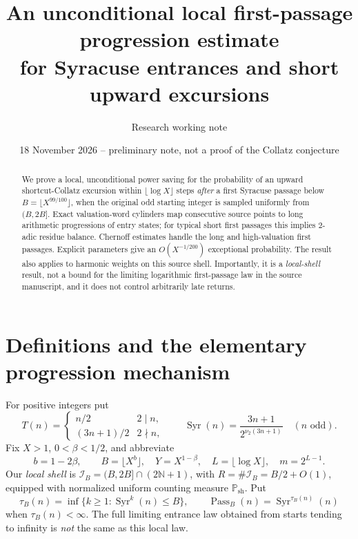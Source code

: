 \documentclass[11pt]{amsart}
\title[Local first-passage progressions]{An unconditional local first-passage progression estimate\\for Syracuse entrances and short upward excursions}
\author{Research working note}
\date{18 November 2026 -- preliminary note, not a proof of the Collatz conjecture}
\theoremstyle{remark}\newtheorem{remark}{Remark}
\newcommand{\N}{\mathbb N}
\newcommand{\Syr}{\operatorname{Syr}}
\newcommand{\Pass}{\operatorname{Pass}}
\newcommand{\Psh}{\mathbb P_{\mathrm{sh}}}
\begin{document}
\begin{abstract}
We prove a local, unconditional power saving for the probability of an upward shortcut-Collatz excursion within $\lfloor\log X\rfloor$ steps \emph{after} a first Syracuse passage below $B=\lfloor X^{99/100}\rfloor$, when the original odd starting integer is sampled uniformly from $(B,2B]$.  Exact valuation-word cylinders map consecutive source points to long arithmetic progressions of entry states; for typical short first passages this implies $2$-adic residue balance.  Chernoff estimates handle the long and high-valuation first passages.  Explicit parameters give an $O(X^{-1/200})$ exceptional probability.  The result also applies to harmonic weights on this source shell.  Importantly, it is a \emph{local-shell} result, not a bound for the limiting logarithmic first-passage law in the source manuscript, and it does not control arbitrarily late returns.
\end{abstract}
\maketitle

\section{Definitions and the elementary progression mechanism}
For positive integers put
\[
 T(n)=\begin{cases}n/2 &2\mid n,\\(3n+1)/2&2\nmid n,\end{cases}
 \qquad \Syr(n)=\frac{3n+1}{2^{\nu_2(3n+1)}}\quad(n\text{ odd}).
\]
Fix $X>1$, $0<\beta<1/2$, and abbreviate
\[
 b=1-2\beta,\qquad B=\lfloor X^b\rfloor,\quad Y=X^{1-\beta},\quad
 L=\lfloor\log X\rfloor,\quad m=2^{L-1}.
\]
Our \emph{local shell} is $\mathcal I_B=(B,2B]\cap(2\N+1)$, with $R=\#\mathcal I_B=B/2+O(1)$, equipped with normalized uniform counting measure $\Psh$.  Put
\[
 \tau_B(n)=\inf\{k\ge1:\Syr^k(n)\le B\},\qquad
 \Pass_B(n)=\Syr^{\tau_B(n)}(n)
\]
when $\tau_B(n)<\infty$.  The full limiting entrance law obtained from starts tending to infinity is \emph{not} the same as this local law.
\end{document}
